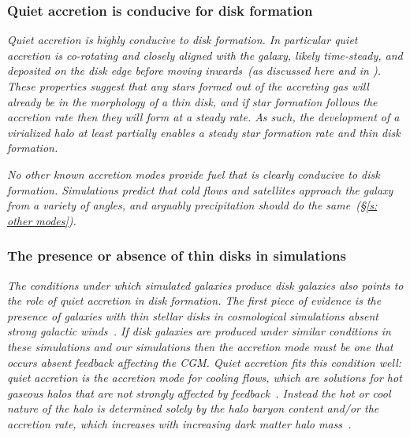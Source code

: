 \documentclass[fleqn,usenatbib]{mnras}
\begin{document}
\subsubsection{Quiet accretion is conducive for disk formation}
\label{s: disk formation -- conducive}

\textit{
Quiet accretion is highly conducive to disk formation.
In particular quiet accretion is co-rotating and closely aligned with the galaxy, likely time-steady, and deposited on the disk edge before moving inwards~(as discussed here and in \citealt{Trapp2021}).
These properties suggest that any stars formed out of the accreting gas will already be in the morphology of a thin disk, and if star formation follows the accretion rate then they will form at a steady rate.
As such, the development of a virialized halo at least partially enables a steady star formation rate and thin disk formation.
}

\textit{
No other known accretion modes provide fuel that is clearly conducive to disk formation.
Simulations predict that cold flows and satellites approach the galaxy from a variety of angles, and arguably precipitation should do the same~(\S\ref{s: other modes}).
}

\subsubsection{The presence or absence of thin disks in simulations}
\label{s: disk formation -- population}

\textit{
The conditions under which simulated galaxies produce disk galaxies also points to the role of quiet accretion in disk formation.
The first piece of evidence is the presence of galaxies with thin stellar disks in cosmological simulations absent strong galactic winds~\citep{Guedes2011, Bird2013}.
If disk galaxies are produced under similar conditions in these simulations and our simulations then the accretion mode must be one that occurs absent feedback affecting the CGM.
Quiet accretion fits this condition well:
quiet accretion is the accretion mode for cooling flows, which are solutions for hot gaseous halos that are \textit{not} strongly affected by feedback~\citep{Stern2019}.
Instead the hot or cool nature of the halo is determined solely by the halo baryon content and/or the accretion rate, which increases with increasing dark matter halo mass~\citep{Stern2020a}.
}
\end{document}
